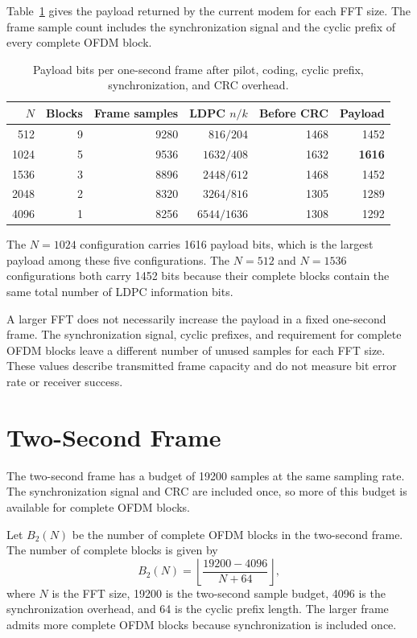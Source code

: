 \documentclass[11pt]{article}
\begin{document}
Table~\ref{tab:payload} gives the payload returned by the current modem for
each FFT size.  The frame sample count includes the synchronization signal
and the cyclic prefix of every complete OFDM block.

\begin{table}[ht]
\centering
\caption{Payload bits per one-second frame after pilot, coding, cyclic prefix,
synchronization, and CRC overhead.}
\label{tab:payload}
\begin{tabular}{@{}rrrrrr@{}}
\toprule
$N$ & Blocks & Frame samples & LDPC $n/k$ & Before CRC & Payload \\
\midrule
 512 & 9 & 9280 & $816/204$   & 1468 & 1452 \\
1024 & 5 & 9536 & $1632/408$  & 1632 & \textbf{1616} \\
1536 & 3 & 8896 & $2448/612$  & 1468 & 1452 \\
2048 & 2 & 8320 & $3264/816$  & 1305 & 1289 \\
4096 & 1 & 8256 & $6544/1636$ & 1308 & 1292 \\
\bottomrule
\end{tabular}
\end{table}

The $N=1024$ configuration carries 1616 payload bits, which is the largest
payload among these five configurations.  The $N=512$ and $N=1536$
configurations both carry 1452 bits because their complete blocks contain the
same total number of LDPC information bits.

A larger FFT does not necessarily increase the payload in a fixed one-second
frame.  The synchronization signal, cyclic prefixes, and requirement for
complete OFDM blocks leave a different number of unused samples for each FFT
size.  These values describe transmitted frame capacity and do not measure
bit error rate or receiver success.

\section{Two-Second Frame}

The two-second frame has a budget of 19200 samples at the same sampling rate.
The synchronization signal and CRC are included once, so more of this budget
is available for complete OFDM blocks.

Let $B_2(N)$ be the number of complete OFDM blocks in the two-second frame.
The number of complete blocks is given by
\begin{equation}
  B_2(N)
  =
  \left\lfloor\frac{19200-4096}{N+64}\right\rfloor,
  \label{eq:blocks-two-seconds}
\end{equation}
where $N$ is the FFT size, 19200 is the two-second sample budget, 4096 is the
synchronization overhead, and 64 is the cyclic prefix length.  The larger
frame admits more complete OFDM blocks because synchronization is included
once.
\end{document}
